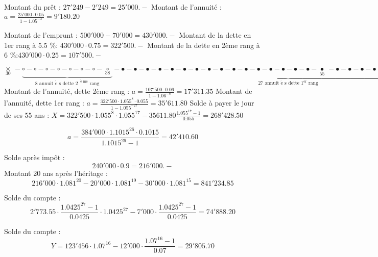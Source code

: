 \begin{solution}
Montant du prêt : $27'249-2'249=25'000.-$
Montant de l'annuité : $a=\frac{25'000\cdot 0.05}{1-{{1.05}^{-3}}}=9'180.20$

Montant de l'emprunt : $500'000-70'000=430'000.-$
Montant de la dette en 1er rang à 5.5 \%: $430'000\cdot 0.75=322'500.-$
Montant de la dette en 2ème rang à 6 \%:$430'000\cdot 0.25=107'500.-$

$\underset{30}{\mathop{\times }}\,-\underbrace{\circ -\circ -\circ -\circ -\circ -\circ -\circ -\underset{38}{\mathop{\circ }}\,}_{\text{8 annuit }\!\!\acute{\mathrm{e}}\!\!\text{ s dette }{{\text{2}}^{\text{ }\!\!\grave{\mathrm{e}}\!\!\text{ me}}}\text{ rang}}-\underbrace{\bullet -\bullet -\bullet -\bullet -\bullet -\bullet -\bullet -\bullet -\bullet -\bullet -\bullet -\bullet -\bullet -\bullet -\bullet -\bullet -\underset{55}{\mathop{\bullet }}\,-\bullet -\bullet -\bullet -\bullet -\bullet -\bullet -\bullet -\bullet -\bullet -\underset{65}{\mathop{\bullet }}\,}_{\text{27 annuit }\!\!\acute{\mathrm{e}}\!\!\text{ s dette }{{\text{1}}^{\text{er}}}\text{ rang}}$
Montant de l'annuité, dette 2ème rang : $a=\frac{107'500\cdot 0.06}{1-{{1.06}^{-8}}}=17'311.35$
Montant de l'annuité, dette 1er rang : $a=\frac{322'500\cdot {{1.055}^{8}}\cdot 0.055}{1-{{1.055}^{-27}}}=35'611.80$
Solde à payer le jour de ses 55 ans : $X=322'500\cdot {{1.055}^{8}}\cdot {{1.055}^{17}}-35611.80\frac{{{1.055}^{17}}-1}{0.055}=268'428.50$
\end{solution}

\begin{solution}
\[a=\frac{384'000\cdot {{1.1015}^{26}}\cdot 0.1015}{{{1.1015}^{26}}-1}=42'410.60\]
\end{solution}

\begin{solution}
Solde après impôt : \[240'000\cdot 0.9=216'000.-\]
		Montant 20 ans après l’héritage : \[216'000\cdot {{1.081}^{20}}-20'000\cdot {{1.081}^{19}}-30'000\cdot {{1.081}^{15}}=841'234.85\]
\end{solution}

\begin{solution}
 Solde du compte :\[2'773.55\cdot \frac{{{1.0425}^{27}}-1}{0.0425}\cdot {{1.0425}^{27}}-7'000\cdot \frac{{{1.0425}^{27}}-1}{0.0425}=74'888.20\]

Solde du compte : \[Y=123'456\cdot {{1.07}^{16}}-12'000\cdot \frac{{{1.07}^{16}}-1}{0.07}=29'805.70\]
\end{solution}

